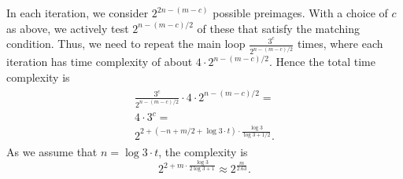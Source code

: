 \documentclass[orivec,envcountsect]{llncs}
\begin{document}
In each iteration, we consider $2^{2n - (m -c)}$ possible preimages. With a choice of $c$ as above,
we actively test $2^{n - (m -c)/2}$ of these that satisfy the matching condition. Thus, we need to repeat the main loop $\tfrac{3^{c}}{ 2^{n - (m -c)/2}}$ times, where each iteration has time complexity of about $4 \cdot 2^{n - (m -c)/2}$. Hence the total time complexity is
\begin{align}
\label{eq:best}
\begin{split}
\tfrac{3^{c}}{ 2^{n - (m -c)/2}} \cdot 4 \cdot 2^{n - (m -c)/2} = \\
4 \cdot 3^{c} = \\
2^{2 + (-n + m/2 + \log 3 \cdot t) \cdot \tfrac{\log 3}{\log 3 + 1/2}}.
\end{split}
\end{align}
As we assume that $n = \log 3 \cdot t$, the complexity is
$$2^{2 + m \cdot \tfrac{\log 3}{2 \log 3 + 1}} \approx 2^{\tfrac{m}{2.63}}.$$
\end{document}
